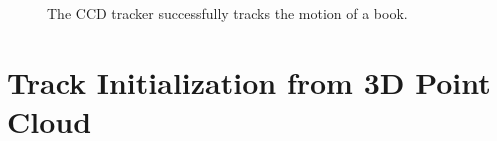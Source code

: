 \begin{figure}[htbp]
\begin{minipage}[t]{0.5\linewidth}
  \end{minipage} 
  \begin{minipage}[t]{0.5\linewidth} 
    \centering 
  \end{minipage} 
  \begin{minipage}[t]{0.5\linewidth} 
    \centering 
  \end{minipage} 
  \caption[The tracking result based on SIFT contour initialization]{The
    CCD tracker successfully tracks the motion of a book.
  }
  \label{fig:sifttracker}
\end{figure}


\section{Track Initialization from 3D Point Cloud}
\label{sec:tifpc}


